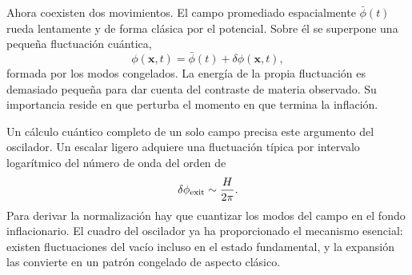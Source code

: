 \begin{classroomqa}
\end{classroomqa}

\begin{classroomqa}
\end{classroomqa}

\begin{classroomqa}
\end{classroomqa}

Ahora coexisten dos movimientos. El campo promediado espacialmente \(\bar\phi(t)\) rueda lentamente y de forma clásica por el potencial. Sobre él se superpone una pequeña fluctuación cuántica,
\[
\phi(\mathbf x,t)=\bar\phi(t)+\delta\phi(\mathbf x,t),
\]
formada por los modos congelados. La energía de la propia fluctuación es demasiado pequeña para dar cuenta del contraste de materia observado. Su importancia reside en que perturba el momento en que termina la inflación.

Un cálculo cuántico completo de un solo campo precisa este argumento del oscilador. Un escalar ligero adquiere una fluctuación típica por intervalo logarítmico del número de onda del orden de
\begin{equation}
\delta\phi_{\rm exit}\sim\frac{H}{2\pi}.
\label{eq:c10-field-amplitude}
\end{equation}
Para derivar la normalización hay que cuantizar los modos del campo en el fondo inflacionario. El cuadro del oscilador ya ha proporcionado el mecanismo esencial: existen fluctuaciones del vacío incluso en el estado fundamental, y la expansión las convierte en un patrón congelado de aspecto clásico.

